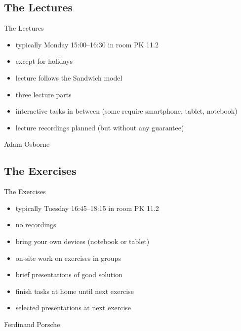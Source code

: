 \subsection{The Lectures}
\begin{frame}{\insertsubsection}
	\begin{fancycolumns}[widths={60}]
		\begin{definition}{The Lectures}
			\begin{itemize}
				\item typically Monday 15:00--16:30 in room PK 11.2
				\item except for holidays 
				\item lecture follows the Sandwich model
				\item three lecture parts
				\item interactive tasks in between (some require smartphone, tablet, notebook)
				\item lecture recordings planned (but without any guarantee)
			\end{itemize}
		\end{definition}
	\nextcolumn
		\begin{note}{Adam Osborne} %
		\end{note}
	\end{fancycolumns}
\end{frame}

\subsection{The Exercises}
\begin{frame}{\insertsubsection}
	\begin{fancycolumns}[widths={55}]
		\begin{definition}{The Exercises}
			\begin{itemize}
				\item typically Tuesday 16:45--18:15 in room PK 11.2
				\item no recordings
				\item bring your own devices (notebook or tablet)
				\item on-site work on exercises in groups
				\item brief presentations of good solution
				\item finish tasks at home until next exercise
				\item selected presentations at next exercise
			\end{itemize}
		\end{definition}
		\nextcolumn
		\begin{note}{Ferdinand Porsche}
		\end{note}
	\end{fancycolumns}
\end{frame}

